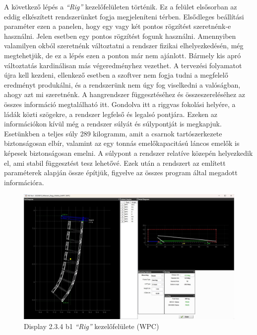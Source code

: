 A következő lépés a \textit{``Rig''} kezelőfelületen történik. Ez a felület elsősorban az eddig elkészített
rendszerünket fogja megjeleníteni térben. Elsődleges beállítási paraméter ezen a panelen, hogy egy vagy két pontos
rögzítést szeretnénk-e használni. Jelen esetben egy pontos  rögzítést fogunk használni. Amennyiben valamilyen okból
szeretnénk változtatni a rendszer fizikai elhelyezkedésén, még megtehetjük, de ez a lépés ezen a ponton már nem ajánlott.
Bármely kis apró változtatás kardinálisan más végeredményhez vezethet. A tervezési folyamatot újra kell kezdeni, ellenkező esetben
a szoftver nem fogja tudni a megfelelő eredményt produkálni, és a rendszerünk nem úgy fog viselkedni a valóságban, ahogy azt mi szeretnénk.
A hangrendszer függesztéséhez és összeszereléséhez az összes információ megtalálható itt. Gondolva itt a riggvas fokolási helyére,
a ládák közti szögekre, a rendszer legfelső és legalsó pontjára.
Ezeken az információkon kívül még a rendszer súlyát és súlypontját is megkapjuk.
Esetünkben a teljes súly 289 kilogramm, amit a csarnok tartószerkezete biztonságosan elbír, valamint az egy tonnás emelőkapacitású
láncos emelők is képesek biztonságosan emelni. A súlypont a rendszer relatíve közepén helyezkedik el, ami stabil függesztést tesz lehetővé.
Ezek után a rendszert az említett paraméterek alapján össze építjük, figyelve az összes program által megadott információra.
\begin{figure}[H]
	\centering
	\includegraphics[width=\textwidth, keepaspectratio]{figures/display_wpc_4.jpg}
	\caption{Display 2.3.4 b1 \textit{``Rig''} kezelőfelülete (WPC)}\label{fig:display_wpc_4}
\end{figure}
